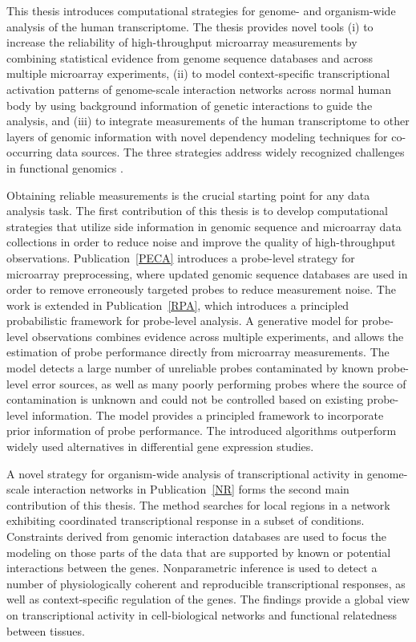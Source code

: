 This thesis introduces computational strategies for genome- and
organism-wide analysis of the human transcriptome. The thesis provides
novel tools (i) to increase the reliability of high-throughput
microarray measurements by combining statistical evidence from genome
sequence databases and across multiple microarray experiments, (ii) to
model context-specific transcriptional activation patterns of
genome-scale interaction networks across normal human body by using
background information of genetic interactions to guide the analysis,
and (iii) to integrate measurements of the human transcriptome to
other layers of genomic information with novel dependency modeling
techniques for co-occurring data sources. The three strategies address
widely recognized challenges in functional genomics
\citep{Collins03,Troyanskaya05}. 

Obtaining reliable measurements is the crucial starting point for any
data analysis task. The first contribution of this thesis is to
develop computational strategies that utilize side information in
genomic sequence and microarray data collections in order to reduce
noise and improve the quality of high-throughput
observations. Publication~\ref{PECA} introduces a probe-level strategy
for microarray preprocessing, where updated genomic sequence databases
are used in order to remove erroneously targeted probes to reduce
measurement noise. The work is extended in Publication~\ref{RPA},
which introduces a principled probabilistic framework for probe-level
analysis. A generative model for probe-level observations combines
evidence across multiple experiments, and allows the estimation of
probe performance directly from microarray measurements. The model
detects a large number of unreliable probes contaminated by known
probe-level error sources, as well as many poorly performing probes
where the source of contamination is unknown and could not be
controlled based on existing probe-level information. The model
provides a principled framework to incorporate prior information of
probe performance. The introduced algorithms outperform widely used
alternatives in differential gene expression studies.

A novel strategy for organism-wide analysis of transcriptional
activity in genome-scale interaction networks in Publication~\ref{NR}
forms the second main contribution of this thesis. The method searches
for local regions in a network exhibiting coordinated transcriptional
response in a subset of conditions.  Constraints derived from genomic
interaction databases are used to focus the modeling on those parts of
the data that are supported by known or potential interactions between
the genes. Nonparametric inference is used to detect a number of
physiologically coherent and reproducible transcriptional responses,
as well as context-specific regulation of the genes. The findings
provide a global view on transcriptional activity in cell-biological
networks and functional relatedness between tissues.

